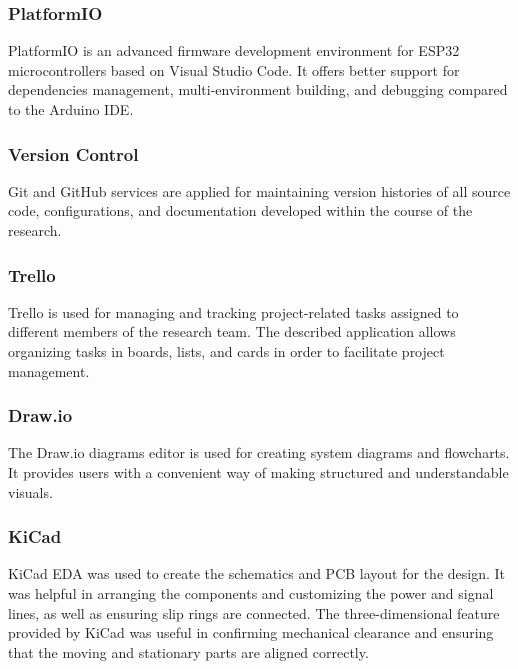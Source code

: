 \subsubsection{PlatformIO}

PlatformIO is an advanced firmware development environment for ESP32 microcontrollers based on Visual Studio Code. It offers better support for dependencies management, multi-environment building, and debugging compared to the Arduino IDE.

\subsubsection{Version Control}

Git and GitHub services are applied for maintaining version histories of all source code, configurations, and documentation developed within the course of the research.

\subsubsection{Trello}

Trello is used for managing and tracking project-related tasks assigned to different members of the research team. The described application allows organizing tasks in boards, lists, and cards in order to facilitate project management.

\subsubsection{Draw.io}

The Draw.io diagrams editor is used for creating system diagrams and flowcharts. It provides users with a convenient way of making structured and understandable visuals.

\subsubsection{KiCad}

KiCad EDA was used to create the schematics and PCB layout for the design. It was helpful in arranging the components and customizing the power and signal lines, as well as ensuring slip rings are connected. The three-dimensional feature provided by KiCad was useful in confirming mechanical clearance and ensuring that the moving and stationary parts are aligned correctly.